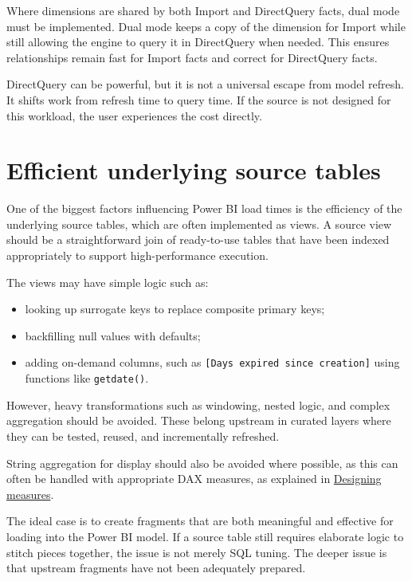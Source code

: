 \documentclass[10pt,openany,10pt]{book}
\providecommand{\tightlist}{%
  \setlength{\itemsep}{0pt}\setlength{\parskip}{0pt}}
\begin{document}
Where dimensions are shared by both Import and DirectQuery facts, dual
mode must be implemented. Dual mode keeps a copy of the dimension for
Import while still allowing the engine to query it in DirectQuery when
needed. This ensures relationships remain fast for Import facts and
correct for DirectQuery facts.

DirectQuery can be powerful, but it is not a universal escape from model
refresh. It shifts work from refresh time to query time. If the source
is not designed for this workload, the user experiences the cost
directly.

\section{Efficient underlying source
tables}\label{efficient-underlying-source-tables}

One of the biggest factors influencing Power BI load times is the
efficiency of the underlying source tables, which are often implemented
as views. A source view should be a straightforward join of ready-to-use
tables that have been indexed appropriately to support high-performance
execution.

The views may have simple logic such as:

\begin{itemize}
\tightlist
\item
  looking up surrogate keys to replace composite primary keys;
\item
  backfilling null values with defaults;
\item
  adding on-demand columns, such as
  \texttt{{[}Days\ expired\ since\ creation{]}} using functions like
  \texttt{getdate()}.
\end{itemize}

However, heavy transformations such as windowing, nested logic, and
complex aggregation should be avoided. These belong upstream in curated
layers where they can be tested, reused, and incrementally refreshed.

String aggregation for display should also be avoided where possible, as
this can often be handled with appropriate DAX measures, as explained in
\hyperref[docs-presenting-insights-designing-measures]{Designing
measures}.

The ideal case is to create fragments that are both meaningful and
effective for loading into the Power BI model. If a source table still
requires elaborate logic to stitch pieces together, the issue is not
merely SQL tuning. The deeper issue is that upstream fragments have not
been adequately prepared.
\end{document}
